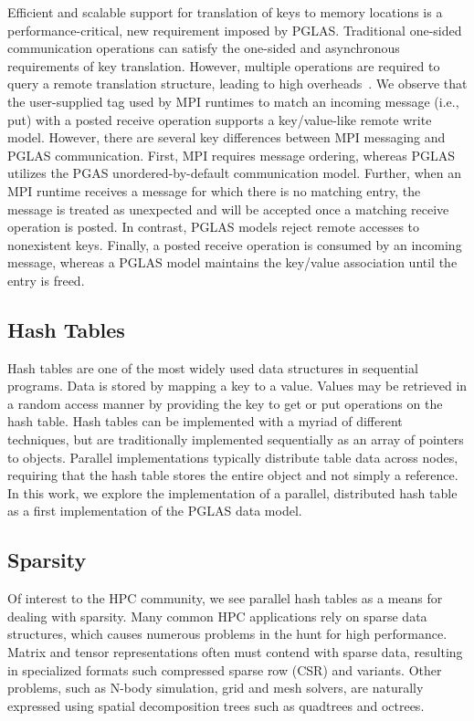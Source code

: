 Efficient and scalable support for translation of keys to memory locations is a
performance-critical, new requirement imposed by PGLAS.  Traditional one-sided
communication operations can satisfy the one-sided and asynchronous
requirements of key translation.  However, multiple operations are required to
query a remote translation structure, leading to high overheads~\cite{namashivayam:15}.  We observe
that the user-supplied tag used by MPI runtimes to match an incoming message
(i.e., put) with a posted receive operation supports a key/value-like remote
write model.
However,
there are several key differences between MPI messaging and PGLAS
communication.  First, MPI requires message ordering, whereas PGLAS utilizes
the PGAS unordered-by-default communication model.  Further, when an MPI
runtime receives a message for which there is no matching entry, the message is
treated as unexpected and will be accepted once a matching receive operation is
posted.  In contrast, PGLAS models reject remote accesses to nonexistent keys.
Finally, a posted receive operation is consumed by an incoming message, whereas
a PGLAS model maintains the key/value association until the entry is freed.

\subsection{Hash Tables}

Hash tables are one of the most widely used data
structures in sequential programs. Data is stored by mapping a key to
a value. Values may be retrieved in a random access manner by
providing the key to get or put operations on the hash table.
%
Hash tables can be implemented with a myriad of different techniques,
but are traditionally implemented sequentially as an array of pointers
to objects. Parallel implementations typically distribute table data
across nodes, requiring that the hash table stores the entire object
and not simply a reference.
%
In this work, we explore the implementation of a parallel, distributed hash
table as a first implementation of the PGLAS data model.

\subsection{Sparsity}
Of interest to the HPC community, we see parallel hash tables as a
means for dealing with sparsity. Many common HPC applications rely on
sparse data structures, which causes numerous problems in the hunt for
high performance. Matrix and tensor representations often must contend
with sparse data, resulting in specialized formats such compressed
sparse row (CSR) and variants. Other problems, such as N-body
simulation, grid and mesh solvers, are naturally expressed using
spatial decomposition trees such as quadtrees and octrees. 

